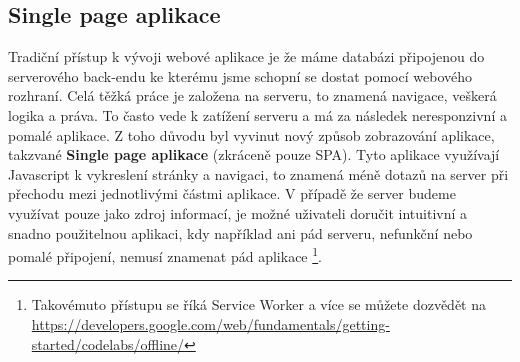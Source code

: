 \subsection{Single page aplikace}
\par Tradiční přístup k vývoji webové aplikace je že máme databázi připojenou do serverového back-endu ke kterému jsme schopní se dostat pomocí webového rozhraní. Celá těžká práce je založena na serveru, to znamená navigace, veškerá logika a práva. To často vede k zatížení serveru a má za následek neresponzivní a pomalé aplikace. Z toho důvodu byl vyvinut nový způsob zobrazování aplikace, takzvané \textbf{Single page aplikace} (zkráceně pouze SPA). Tyto aplikace využívají Javascript k vykreslení stránky a navigaci, to znamená méně dotazů na server při přechodu mezi jednotlivými částmi aplikace. V případě že server budeme využívat pouze jako zdroj informací, je možné uživateli doručit intuitivní a snadno použitelnou aplikaci, kdy například ani pád serveru, nefunkční nebo pomalé připojení, nemusí znamenat pád aplikace \footnote{Takovémuto přístupu se říká Service Worker a více se můžete dozvědět na \url{https://developers.google.com/web/fundamentals/getting-started/codelabs/offline/}}. \cite{serverless-singlepage-apps}

